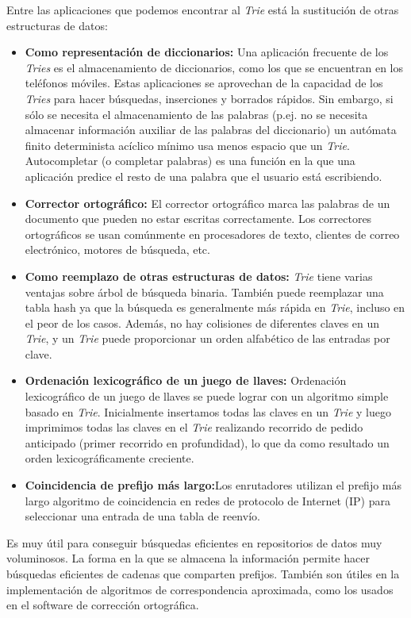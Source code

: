 Entre las aplicaciones que podemos encontrar al \emph{Trie} está la sustitución de otras estructuras de datos:

\begin{itemize}
	\item \textbf{Como representación de diccionarios:}  Una aplicación frecuente de los \emph{Tries} es el almacenamiento de diccionarios, como los que se encuentran en los teléfonos móviles. Estas aplicaciones se aprovechan de la capacidad de los \emph{Tries} para hacer búsquedas, inserciones y borrados rápidos. Sin embargo, si sólo se necesita el almacenamiento de las palabras (p.ej. no se necesita almacenar información auxiliar de las palabras del diccionario) un autómata finito determinista acíclico mínimo usa menos espacio que un \emph{Trie}. Autocompletar (o completar palabras) es una función en la que una aplicación predice el resto de una palabra que el usuario está escribiendo.
	
	\item \textbf{Corrector ortográfico:} El corrector ortográfico marca las palabras de un documento que pueden no estar escritas correctamente. Los correctores ortográficos se usan comúnmente en procesadores de texto, clientes de correo electrónico, motores de búsqueda, etc.
	
	\item \textbf{Como reemplazo de otras estructuras de datos:} \emph{Trie} tiene varias ventajas sobre árbol de búsqueda binaria. También puede reemplazar una tabla hash ya que la búsqueda es generalmente más rápida en \emph{Trie}, incluso en el peor de los casos. Además, no hay colisiones de diferentes claves en un \emph{Trie}, y un \emph{Trie} puede proporcionar un orden alfabético de las entradas por clave.
	
	\item \textbf{Ordenación lexicográfico de un juego de llaves:} Ordenación lexicográfico de un juego de llaves se puede lograr con un algoritmo simple basado en \emph{Trie}. Inicialmente insertamos todas las claves en un \emph{Trie} y luego imprimimos todas las claves en el \emph{Trie} realizando recorrido de pedido anticipado (primer recorrido en profundidad), lo que da como resultado un orden lexicográficamente creciente.
	
	\item \textbf{Coincidencia de prefijo más largo:}Los enrutadores utilizan el prefijo más largo algoritmo de coincidencia en redes de protocolo de Internet (IP) para seleccionar una entrada de una tabla de reenvío.
\end{itemize}


Es muy útil para conseguir búsquedas eficientes en repositorios de datos muy voluminosos. La forma en la que se almacena la información permite hacer búsquedas eficientes de cadenas que comparten prefijos. También son útiles en la implementación de algoritmos de correspondencia aproximada, como los usados en el software de corrección ortográfica.  